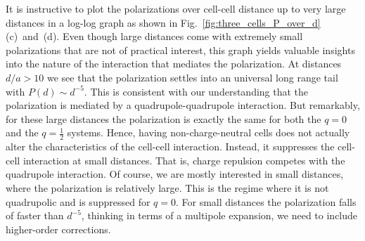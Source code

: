 It is instructive to plot the polarizations over cell-cell distance up to very
large distances in a log-log graph as shown in
Fig.~\ref{fig:three_cells_P_over_d}(c)~and~(d). Even though large distances come
with extremely small polarizations that are not of practical interest, this
graph yields valuable insights into the nature of the interaction that mediates
the polarization. At distances $d/a > 10$ we see that the polarization settles
into an universal long range tail with $P(d) \sim d^{-5}$.  This is consistent
with our understanding that the polarization is mediated by a
quadrupole-quadrupole interaction. But remarkably, for these large distances the
polarization is exactly the same for both the $q=0$ and the $q=\frac{1}{2}$
systems. Hence, having non-charge-neutral cells does not actually alter the
characteristics of the cell-cell interaction. Instead, it suppresses the
cell-cell interaction at small distances. That is, charge repulsion competes
with the quadrupole interaction. Of course, we are mostly interested in small
distances, where the polarization is relatively large. This is the regime where
it is not quadrupolic and is suppressed for $q = 0$. For small distances the
polarization falls of faster than $d^{-5}$, thinking in terms of a multipole
expansion, we need to include higher-order corrections.

